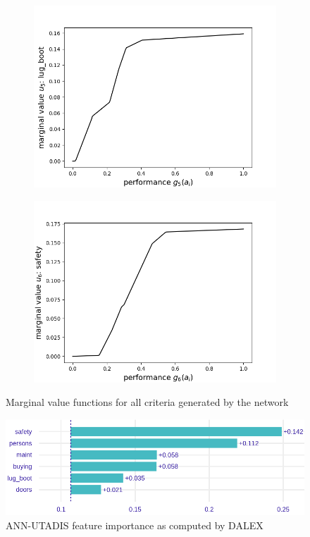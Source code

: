 \documentclass[../main.tex]{subfiles}
\begin{document}
\begin{figure}[H]
    \begin{subfigure}[b]{0.48\linewidth}
        \includegraphics[width=\linewidth]{../img/marginal4.png}
    \end{subfigure}
    \begin{subfigure}[b]{0.48\linewidth}
        \includegraphics[width=\linewidth]{../img/marginal5.png}
    \end{subfigure}
    \caption{Marginal value functions for all criteria generated by the network}
\end{figure}

\begin{figure}[H]
    \centering
    \includegraphics[width=\linewidth]{../img/UTA-feature-importance.png}
    \caption{ANN-UTADIS feature importance as computed by DALEX}
    \label{fig:UTA-feats}
\end{figure}
\end{document}
